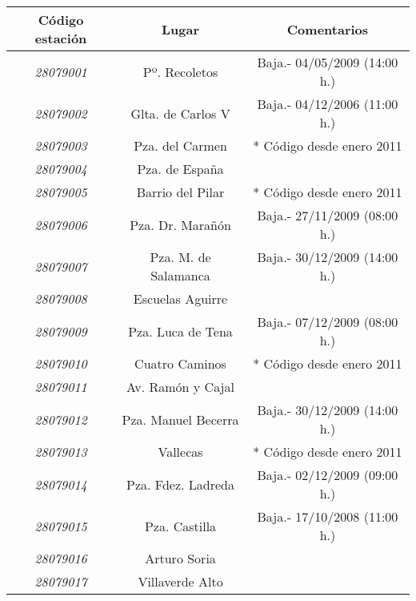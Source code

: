 \begin{table}[H]
			\begin{center}
	\begin{tabular}{|c|c|c|}
	
		\hline
		\textbf{Código estación} & \textbf{Lugar}       & \textbf{Comentarios}         \\ \hline
		\textit{28079001}        & Pº. Recoletos        & Baja.- 04/05/2009 (14:00 h.) \\ \hline
		\textit{28079002}        & Glta. de Carlos V    & Baja.- 04/12/2006 (11:00 h.) \\ \hline
		\textit{28079003}        & Pza. del Carmen      & * Código desde enero 2011    \\ \hline
		\textit{28079004}        & Pza. de España       &                              \\ \hline
		\textit{28079005}        & Barrio del Pilar     & * Código desde enero 2011    \\ \hline
		\textit{28079006}        & Pza. Dr. Marañón     & Baja.- 27/11/2009 (08:00 h.) \\ \hline
		\textit{28079007}        & Pza. M. de Salamanca & Baja.- 30/12/2009 (14:00 h.) \\ \hline
		\textit{28079008}        & Escuelas Aguirre     &                              \\ \hline
		\textit{28079009}        & Pza. Luca de Tena    & Baja.- 07/12/2009 (08:00 h.) \\ \hline
		\textit{28079010}        & Cuatro Caminos       & * Código desde enero 2011    \\ \hline
		\textit{28079011}        & Av. Ramón y Cajal    &                              \\ \hline
		\textit{28079012}        & Pza. Manuel Becerra  & Baja.- 30/12/2009 (14:00 h.) \\ \hline
		\textit{28079013}        & Vallecas             & * Código desde enero 2011    \\ \hline
		\textit{28079014}        & Pza. Fdez. Ladreda   & Baja.- 02/12/2009 (09:00 h.) \\ \hline
		\textit{28079015}        & Pza. Castilla        & Baja.- 17/10/2008 (11:00 h.) \\ \hline
		\textit{28079016}        & Arturo Soria         &                              \\ \hline
		\textit{28079017}        & Villaverde Alto      &                              \\ \hline

\end{tabular}
\end{center}
\end{table}
